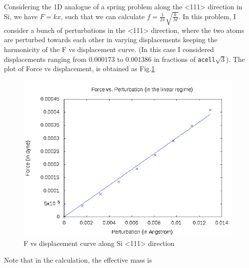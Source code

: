 \documentclass[12pt]{article} %
\begin{document}
Considering the 1D analogue of a spring problem along the <111> direction in Si, we have $F = kx$, such that we can calculate $f = \frac{1}{2\pi}\sqrt{\frac{k}{M}}$. In this problem, I consider a bunch of perturbations in the <111> direction, where the two atoms are perturbed towards each other in varying displacements keeping the harmonicity of the F vs displacement curve. (In this case I considered displacements ranging from $0.000173$ to $0.001386$ in fractions of \verb|acell|$\sqrt{3}$). The plot of Force vs displacement, is obtained as Fig.\ref{FvsD}
\begin{center}
  \begin{figure}[t]
    \includegraphics[scale=1.0]{data_engn.png}
    \caption{F vs displacement curve along Si <111> direction}
    \label{FvsD}
  \end{figure}
\end{center}
Note that in the calculation, the effective mass is 
\end{document}
